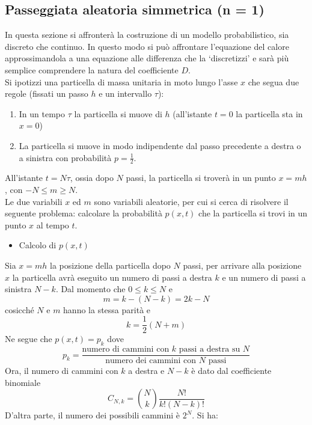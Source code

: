 \documentclass[a4paper,12pt, draft]{article}
\theoremstyle{break}
\numberwithin{equation}{section}
\begin{document}
\subsection{Passeggiata aleatoria simmetrica (n = 1)}
In questa sezione si affronterà la costruzione di un modello probabilistico, sia discreto che continuo.
In questo modo si può affrontare l'equazione del calore approssimandola a una equazione alle differenza che la `discretizzi' e sarà più semplice comprendere la natura del coefficiente \(D\). \\
Si ipotizzi una particella di massa unitaria in moto lungo l'asse \(x\) che segua due regole (fissati un passo \(h\) e un intervallo \(\tau\)):
\begin{enumerate}
  \item In un tempo \(\tau\) la particella si muove di \(h\) (all'istante \(t = 0\) la particella sta in \(x = 0\))
  \item La particella si muove in modo indipendente dal passo precedente a destra o a sinistra con probabilità \(p = \frac{1}{2}\).
\end{enumerate}
All'istante \(t = N\tau\), ossia dopo \(N\) passi, la particella si troverà in un punto \(x = mh\), con \(-N \leq m \geq N\). \\
Le due variabili \(x\) ed \(m\) sono variabili aleatorie, per cui si cerca di risolvere il seguente problema: calcolare la probabilità \(p(x,t)\) che la particella si trovi in un punto \(x\) al tempo \(t\).
\begin{itemize}
  \item Calcolo di \(p(x,t)\)
\end{itemize}
Sia \(x = mh\) la posizione della particella dopo \(N\) passi, per arrivare alla posizione \(x\) la particella avrà eseguito un numero di passi a destra \(k\) e un numero di passi a sinistra \(N - k\). Dal momento che \(0 \leq k \leq N\) e 
\begin{equation}
  m = k - (N - k) = 2k - N
\end{equation}
cosicché \(N\) e \(m\) hanno la stessa parità e 
\[
k = \frac{1}{2} (N + m)  
\] 
Ne segue che \(p(x,t) = p_k\) dove\begin{equation}
  p_k = \frac{\mbox{numero di cammini con }k \mbox{ passi a destra su }N}{\mbox{numero dei cammini con }N\mbox{ passi}}
\end{equation}
Ora, il numero di cammini con \(k\) a destra e \(N - k\) è dato dal coefficiente binomiale
\[
  C_{N, k} = \binom{N}{k} \frac{N!}{k!(N - k)!} 
\]
D'altra parte, il numero dei possibili cammini è \(2^N\). Si ha:
\end{document}
